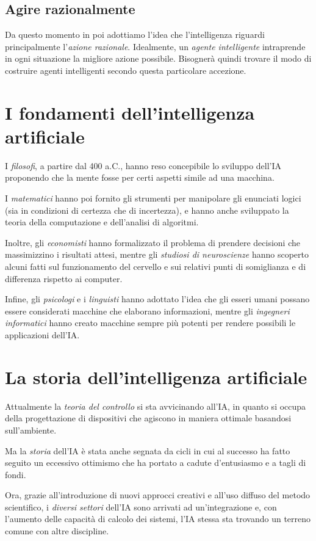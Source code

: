 \documentclass[11pt,oneside]{book}
\begin{document}
\subsection{Agire razionalmente}
Da questo momento in poi adottiamo l'idea che l'intelligenza riguardi principalmente l'\textit{azione razionale}. Idealmente, un \textit{agente intelligente} intraprende in ogni situazione la migliore azione possibile. Bisognerà quindi trovare il modo di costruire agenti intelligenti secondo questa particolare accezione.


\section{I fondamenti dell'intelligenza artificiale}
I \textit{filosofi}, a partire dal 400 a.C., hanno reso concepibile lo sviluppo dell'IA proponendo che la mente fosse per certi aspetti simile ad una macchina.

I \textit{matematici} hanno poi fornito gli strumenti per manipolare gli enunciati logici (sia in condizioni di certezza che di incertezza), e hanno anche sviluppato la teoria della computazione e dell'analisi di algoritmi.

Inoltre, gli \textit{economisti} hanno formalizzato il problema di prendere decisioni che massimizzino i risultati attesi, mentre gli \textit{studiosi di neuroscienze} hanno scoperto alcuni fatti sul funzionamento del cervello e sui relativi punti di somiglianza e di differenza rispetto ai computer.

Infine, gli \textit{psicologi} e i \textit{linguisti} hanno adottato l'idea che gli esseri umani possano essere considerati macchine che elaborano informazioni, mentre gli \textit{ingegneri informatici} hanno creato macchine sempre più potenti per rendere possibili le applicazioni dell'IA.


\section{La storia dell'intelligenza artificiale}
Attualmente la \textit{teoria del controllo} si sta avvicinando all'IA, in quanto si occupa della progettazione di dispositivi che agiscono in maniera ottimale basandosi sull'ambiente.

Ma la \textit{storia} dell'IA è stata anche segnata da cicli in cui al successo ha fatto seguito un eccessivo ottimismo che ha portato a cadute d'entusiasmo e a tagli di fondi.

Ora, grazie all'introduzione di nuovi approcci creativi e all'uso diffuso del metodo scientifico, i \textit{diversi settori} dell'IA sono arrivati ad un'integrazione e, con l'aumento delle capacità di calcolo dei sistemi, l'IA stessa sta trovando un terreno comune con altre discipline.
\end{document}
